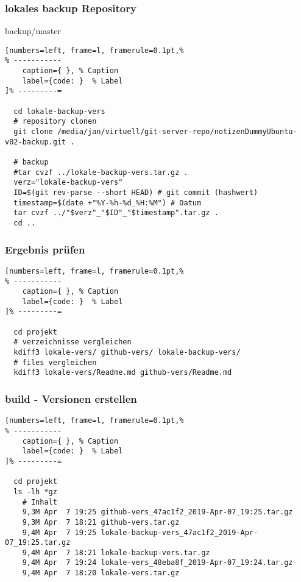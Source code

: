 \subsubsection{lokales backup
Repository}\label{lokales-backup-repository}

backup/master

\lstset{language=Bash} %
\begin{lstlisting}[numbers=left, frame=l, framerule=0.1pt,%
% -----------
	caption={ }, % Caption
	label={code: }  % Label
]% ---------=

  cd lokale-backup-vers
  # repository clonen
  git clone /media/jan/virtuell/git-server-repo/notizenDummyUbuntu-v02-backup.git .

  # backup
  #tar cvzf ../lokale-backup-vers.tar.gz .
  verz="lokale-backup-vers"
  ID=$(git rev-parse --short HEAD) # git commit (hashwert)
  timestamp=$(date +"%Y-%h-%d_%H:%M") # Datum
  tar cvzf ../"$verz"_"$ID"_"$timestamp".tar.gz .
  cd ..
\end{lstlisting}

\subsubsection{Ergebnis prüfen}\label{ergebnis-pruefen-1}

\lstset{language=Bash} %
\begin{lstlisting}[numbers=left, frame=l, framerule=0.1pt,%
% -----------
	caption={ }, % Caption
	label={code: }  % Label
]% ---------=

  cd projekt
  # verzeichnisse vergleichen
  kdiff3 lokale-vers/ github-vers/ lokale-backup-vers/
  # files vergleichen
  kdiff3 lokale-vers/Readme.md github-vers/Readme.md
\end{lstlisting}

\subsubsection{build - Versionen
erstellen}\label{build-versionen-erstellen}

\lstset{language=Bash} %
\begin{lstlisting}[numbers=left, frame=l, framerule=0.1pt,%
% -----------
	caption={ }, % Caption
	label={code: }  % Label
]% ---------=

  cd projekt
  ls -lh *gz
    # Inhalt
    9,3M Apr  7 19:25 github-vers_47ac1f2_2019-Apr-07_19:25.tar.gz
    9,3M Apr  7 18:21 github-vers.tar.gz
    9,4M Apr  7 19:25 lokale-backup-vers_47ac1f2_2019-Apr-07_19:25.tar.gz
    9,4M Apr  7 18:21 lokale-backup-vers.tar.gz
    9,4M Apr  7 19:24 lokale-vers_48eba8f_2019-Apr-07_19:24.tar.gz
    9,4M Apr  7 18:20 lokale-vers.tar.gz
\end{lstlisting}

